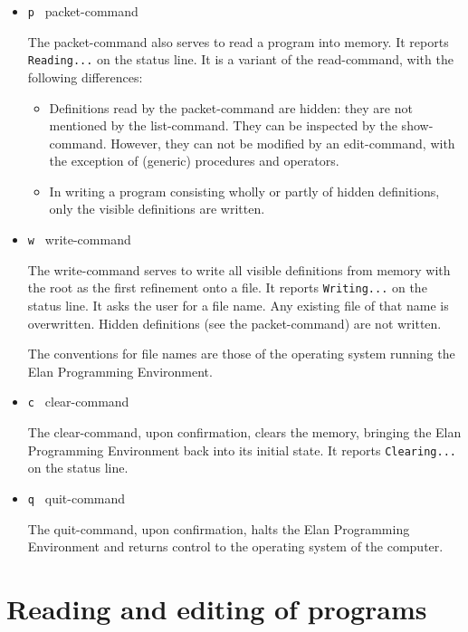 \begin{itemize}
If a file with the desired name was not present the Elan Programming
Environment produces an overview of all program files that are
present (again a negative menu). 
 
The conventions for file names are those of the operating system
running the Elan Programming Environment.
\item{\tt p } packet-command

The packet-command also serves to read a program into memory.
It reports {\tt Reading...} on the status line. It is a variant
of the read-command, with the following differences:

\begin{itemize}
\item 	Definitions read by the packet-command are hidden: they
	are not mentioned by the list-command. They can be inspected
	by the show-command. However, they can not be modified by an
	edit-command, with the exception of (generic) procedures and operators.
\item	In writing a program consisting wholly or partly of hidden
	definitions, only the visible definitions are written.
\end{itemize}
\item{\tt w } write-command

The write-command serves to write all visible definitions from
memory with the root as the first refinement onto a file. It
reports {\tt Writing...} on the status line. It asks the user for a
file name. Any existing file of that name is overwritten. Hidden
definitions (see the packet-command) are not written.

The conventions for file names are those of the operating system
running the Elan Programming Environment.
\item{\tt c } clear-command

The clear-command, upon confirmation, clears the memory, bringing
the Elan Programming Environment back into its initial state.
It reports  {\tt Clearing...} on the status line.
\item{\tt q } quit-command

The quit-command, upon confirmation, halts the Elan Programming
Environment and returns control to the operating system of the
computer.
\end{itemize}

\section{Reading and editing of programs}

